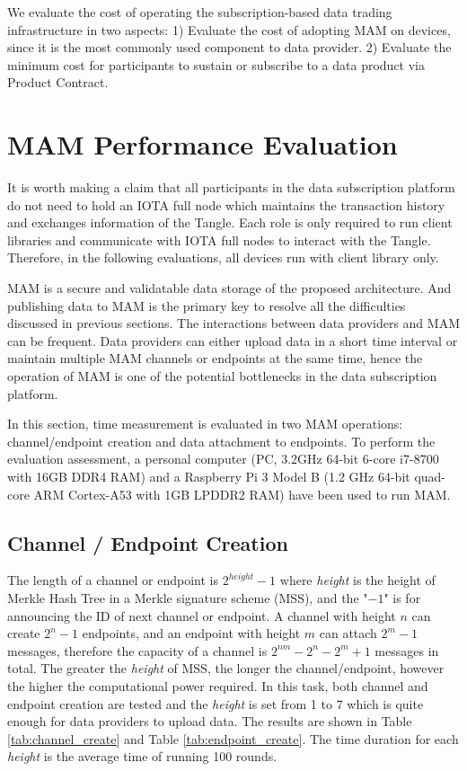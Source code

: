 \begin{spacing}{2.0}
\label{section:evaluation}
We evaluate the cost of operating the subscription-based data trading infrastructure in two aspects: 1) Evaluate the cost of adopting MAM on devices, since it is the most commonly used component to data provider. 2) Evaluate the minimum cost for participants to sustain or subscribe to a data product via Product Contract.

\section{MAM Performance Evaluation}
\label{section:mam_performance}
It is worth making a claim that all participants in the data subscription platform do not need to hold an IOTA full node which maintains the transaction history and exchanges information of the Tangle. Each role is only required to run client libraries and communicate with IOTA full nodes to interact with the Tangle. Therefore, in the following evaluations, all devices run with client library only.

MAM is a secure and validatable data storage of the proposed architecture. And publishing data to MAM is the primary key to resolve all the difficulties discussed in previous sections. The interactions between data providers and MAM can be frequent. Data providers can either upload data in a short time interval or maintain multiple MAM channels or endpoints at the same time, hence the operation of MAM is one of the potential bottlenecks in the data subscription platform.

In this section, time measurement is evaluated in two MAM operations: channel/endpoint creation and data attachment to endpoints. To perform the evaluation assessment, a personal computer (PC, 3.2GHz 64-bit 6-core i7-8700 with 16GB DDR4 RAM) and a Raspberry Pi 3 Model B (1.2 GHz 64-bit quad-core ARM Cortex-A53 with 1GB LPDDR2 RAM) have been used to run MAM.

\subsection{Channel / Endpoint Creation}
The length of a channel or endpoint is $2^{height}-1$ where \textit{height} is the height of Merkle Hash Tree in a Merkle signature scheme (MSS), and the "$-1$" is for announcing the ID of next channel or endpoint. A channel with height $n$ can create $2^n-1$ endpoints, and an endpoint with height $m$ can attach $2^m-1$ messages, therefore the capacity of a channel is $2^{nm}-2^n-2^m+1$ messages in total. The greater the \textit{height} of MSS, the longer the channel/endpoint, however the higher the computational power required. In this task, both channel and endpoint creation are tested and the \textit{height} is set from 1 to 7 which is quite enough for data providers to upload data. The results are shown in Table \ref{tab:channel_create} and Table \ref{tab:endpoint_create}. The time duration for each \textit{height} is the average time of running 100 rounds.


\end{spacing}
